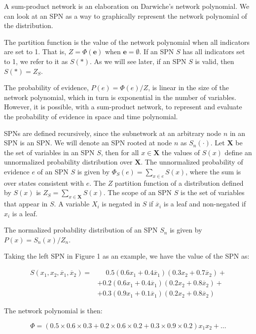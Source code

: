\documentclass[a4paper,10pt]{article}
\theoremstyle{plain}
\begin{document}
A sum-product network is an elaboration on Darwiche's network polynomial. We can look at an SPN as
a way to graphically represent the network polynomial of the distribution.

The partition function is the value of the network polynomial when all indicators are set to 1.
That is, $Z=\Phi(\mathbf{e})$ when $\mathbf{e}=\emptyset$. If an SPN $S$ has all indicators set to
1, we refer to it as $S(*)$. As we will see later, if an SPN $S$ is valid, then $S(*)=Z_S$.

The probability of evidence, $P(e)=\Phi(e)/Z$, is linear in the size of the network polynomial,
which in turn is exponential in the number of variables. However, it is possible, with a
sum-product network, to represent and evaluate the probability of evidence in space and time
polynomial.

SPNs are defined recursively, since the subnetwork at an arbitrary node $n$ in an SPN is an SPN\@.
We will denote an SPN rooted at node $n$ as $S_n(\cdot)$. Let $\mathbf{X}$ be the set of variables
in an SPN $S$, then for all $x\in \mathbf{X}$ the values of $S(x)$ define an unnormalized
probability distribution over $\mathbf{X}$. The unnormalized probability of evidence $e$ of an SPN
$S$ is given by $\Phi_S(e)=\sum_{x\in e}S(x)$, where the sum is over states consistent with $e$.
The $Z$ partition function of a distribution defined by $S(x)$ is $Z_S=\sum_{x\in \mathbf{X}}S(x)$.
The scope of an SPN $S$ is the set of variables that appear in $S$. A variable $X_i$ is negated in
$S$ if $\overline{x}_i$ is a leaf and non-negated if $x_i$ is a leaf.

The normalized probability distribution of an SPN $S_n$ is given by $P(x)=S_n(x)/Z_n$.

Taking the left SPN in Figure 1 as an example, we have the value of the SPN as:

\begin{align*}
  S(x_1,x_2,\overline{x}_1,\overline{x}_2)=&\phantom{{} +{}}0.5(0.6x_1+0.4\overline{x}_1)(0.3x_2+0.7\overline{x}_2)+\\
                                           &+0.2(0.6x_1+0.4\overline{x}_1)(0.2x_2+0.8\overline{x}_2)+\\
                                           &+0.3(0.9x_1+0.1\overline{x}_1)(0.2x_2+0.8\overline{x}_2)
\end{align*}

The network polynomial is then:

\begin{equation*}
  \Phi = (0.5\times0.6\times0.3+0.2\times0.6\times0.2+0.3\times0.9\times0.2)x_1x_2+\ldots
\end{equation*}
\end{document}
